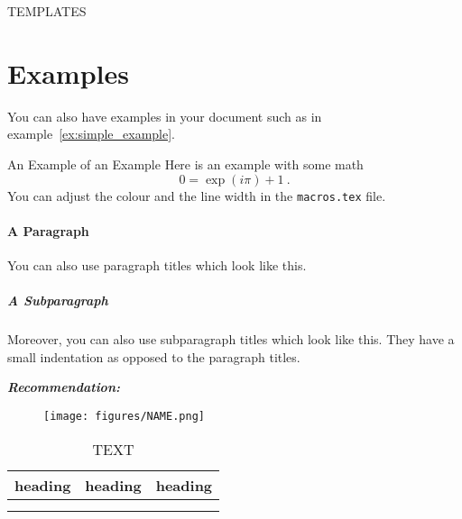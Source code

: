 
TEMPLATES 

\section{Examples}
You can also have examples in your document such as in example~\ref{ex:simple_example}.
\begin{example}{An Example of an Example}
  \label{ex:simple_example}
  Here is an example with some math
  \begin{equation}
    0 = \exp(i\pi)+1\ .
  \end{equation}
  You can adjust the colour and the line width in the {\tt macros.tex} file.
\end{example}


\paragraph{A Paragraph}
You can also use paragraph titles which look like this.

\subparagraph{A Subparagraph} Moreover, you can also use subparagraph titles which look like this. They have a small indentation as opposed to the paragraph titles.


\noindent
\begin{tcolorbox}
    \parbox{\textwidth}{
    \emph{\textbf{Recommendation:}   }}
\end{tcolorbox}

\noindent
{}

\begin{figure}
    \centering
    \texttt{[image: figures/NAME.png]}
    \caption{}
    \label{fig:decisionsupporttool}
\end{figure}



\begin{table}[]
    \caption{TEXT}
    \centering
    \begin{tabular}{c|c|c}
     heading & heading & heading \\ \hline 
       & & \\
       & & \\
    \end{tabular}
    \label{tab:initial_considerations}
\end{table}


